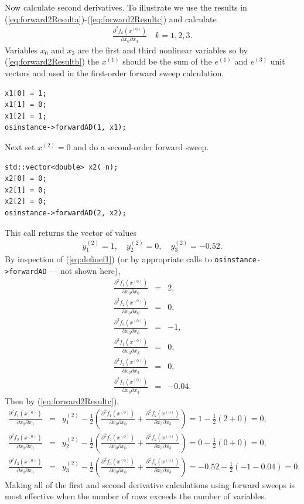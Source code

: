 \documentclass[11pt]{article}
\newcommand{\DD}[3]{ \frac{\partial^2 #1}{\partial #2 \partial #3} }
\renewcommand{\_}{{\char"5F}}
\renewcommand{\{}{{\char"7B}}
\renewcommand{\}}{{\char"7D}}
\renewcommand{\^}{{\char"0D}}
\renewcommand{\'}{{\char"0D}}
\begin{document}
\begin{enumerate}[Step 1:]
Now calculate second derivatives.  To illustrate we use the results in (\ref{eq:forward2Resulta})-(\ref{eq:forward2Resultc}) and calculate
\begin{eqnarray*}
\DD{f_{k}(x^{(0)})}{x_{0}}{x_{3}} \quad k = 1, 2, 3.
\end{eqnarray*}
Variables $x_{0}$ and $x_{3}$ are the first and third nonlinear variables so by  (\ref{eq:forward2Resultb}) the $x^{(1)}$ should be the sum of the $e^{(1)}$ and $e^{(3)}$ unit vectors and used in the  first-order forward sweep calculation.
\begin{verbatim}
x1[0] = 1;
x1[1] = 0;
x1[2] = 1;
osinstance->forwardAD(1, x1);
\end{verbatim}
Next set $x^{(2)} = 0$ and do a second-order forward sweep.
\begin{verbatim}
std::vector<double> x2( n);
x2[0] = 0;
x2[1] = 0;
x2[2] = 0;
osinstance->forwardAD(2, x2);
\end{verbatim}
This call returns the vector of  values
\begin{eqnarray*}
y_{1}^{(2)}  = 1, \quad y_{2}^{(2)}  = 0, \quad y_{3}^{(2)} = -0.52.
\end{eqnarray*}
By inspection of (\ref{eq:definef1}) (or by appropriate calls to {\tt osinstance->forwardAD} --- not shown here),
\begin{eqnarray*}
\DD{f_{1}(x^{(0)})}{x_{0}}{x_{0}} &=&  2, \\
\DD{f_{2}(x^{(0)})}{x_{0}}{x_{0}} &=&  0, \\
\DD{f_{3}(x^{(0)})}{x_{0}}{x_{0}} &=& -1, \\
\DD{f_{1}(x^{(0)})}{x_{3}}{x_{3}} &=&  0, \\
\DD{f_{2}(x^{(0)})}{x_{3}}{x_{3}} &=&  0, \\
\DD{f_{3}(x^{(0)})}{x_{3}}{x_{3}} &=& -0.04.
\end{eqnarray*}
Then by (\ref{eq:forward2Resultc}),
\begin{eqnarray*}
\DD{f_{1}(x^{(0)})}{x_{0}}{x_{3}} &=&  y_{1}^{(2)}  -  \frac{1}{2} \left( \DD{f_{1}(x^{(0)})}{x_{0}}{x_{0}}  +  \DD{f_{k}(x^{(0)})}{x_{3}}{x_{3}}  \right) = 1   -    \frac{1}{2}(2 +  0) = 0, \\
\DD{f_{2}(x^{(0)})}{x_{0}}{x_{3}} &=&  y_{2}^{(2)}  -  \frac{1}{2} \left( \DD{f_{2}(x^{(0)})}{x_{0}}{x_{0}}  +  \DD{f_{k}(x^{(0)})}{x_{3}}{x_{3}}  \right) = 0   -    \frac{1}{2}(0 +  0) = 0, \\
\DD{f_{3}(x^{(0)})}{x_{0}}{x_{3}} &=&  y_{3}^{(2)}  -  \frac{1}{2} \left( \DD{f_{3}(x^{(0)})}{x_{0}}{x_{0}}  +  \DD{f_{k}(x^{(0)})}{x_{3}}{x_{3}}  \right) = -0.52 -  \frac{1}{2}(-1 - 0.04) = 0.
\end{eqnarray*}
Making all of the first and second derivative calculations using forward sweeps is most effective when the number of rows exceeds the number of variables.



\end{enumerate}
\end{document}
